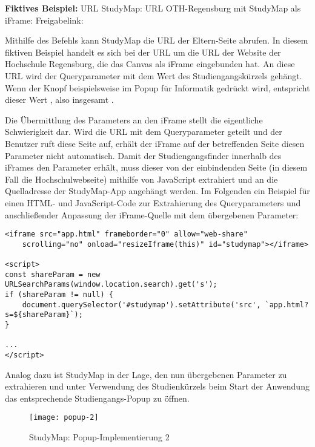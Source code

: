 \noindent
\textbf{Fiktives Beispiel:}\newline
URL StudyMap: \newline
URL OTH-Regensburg mit StudyMap als iFrame: \newline
Freigabelink: \newline

Mithilfe des Befehls  kann StudyMap die URL der Eltern-Seite abrufen. In diesem fiktiven Beispiel handelt es sich bei der URL um die URL der Website der Hochschule Regensburg, die das Canvas als iFrame eingebunden hat. An diese URL wird der Queryparameter  mit dem Wert des Studiengangskürzels gehängt. Wenn der Knopf beispielsweise im Popup für Informatik gedrückt wird, entspricht dieser Wert , also insgesamt .

Die Übermittlung des Parameters an den iFrame stellt die eigentliche Schwierigkeit dar. Wird die URL mit dem Queryparameter geteilt und der Benutzer ruft diese Seite auf, erhält der iFrame auf der betreffenden Seite diesen Parameter nicht automatisch. Damit der Studiengangsfinder innerhalb des iFrames den Parameter erhält, muss dieser von der einbindenden Seite (in diesem Fall die Hochschulwebseite) mithilfe von JavaScript extrahiert und an die Quelladresse der StudyMap-App angehängt werden. Im Folgenden ein Beispiel für einen HTML- und JavaScript-Code zur Extrahierung des Queryparameters  und anschließender Anpassung der iFrame-Quelle mit dem übergebenen Parameter:
\begin{lstlisting}[style=Python]
<iframe src="app.html" frameborder="0" allow="web-share"
    scrolling="no" onload="resizeIframe(this)" id="studymap"></iframe>

<script>
const shareParam = new URLSearchParams(window.location.search).get('s');
if (shareParam != null) {
    document.querySelector('#studymap').setAttribute('src', `app.html?s=${shareParam}`);
}

...
</script>
\end{lstlisting}

Analog dazu ist StudyMap in der Lage, den nun übergebenen Parameter zu extrahieren und unter Verwendung des Studienkürzels beim Start der Anwendung das entsprechende Studiengangs-Popup zu öffnen. 

\begin{figure}[H]
    \centering
    \texttt{[image: popup-2]}
    \caption{StudyMap: Popup-Implementierung 2}
    \label{fig:popup-2}
\end{figure}

